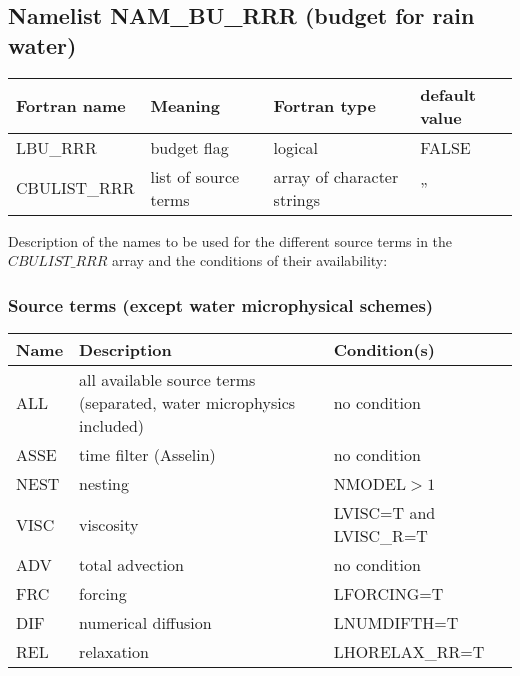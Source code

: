 \subsection{Namelist NAM\_BU\_RRR (budget for rain water)}

\begin{longtable} {|p{}|p{}|>{\centering}p{}|p{}<{\centering}|}
\hline
Fortran name & Meaning & Fortran type & default value \\
\hline \hline
\endhead
LBU\_RRR & budget flag & logical & FALSE\index{LBU\_RRR!\innam{NAM\_BU\_RRR}} \\\hline
CBULIST\_RRR & list of source terms & array of character strings & ''\index{CBULIST\_RRR!\innam{NAM\_BU\_RRR}} \\\hline
\end{longtable}

Description of the names to be used for the different source terms in the $CBULIST\_RRR$ array and the conditions of their availability:

\subsubsection{Source terms (except water microphysical schemes)}

\begin{longtable} {|p{}|p{}|p{}|}
\hline
Name & Description & Condition(s) \\
\hline \hline
\endhead
ALL    & all available source terms (separated,  water microphysics included) & no condition \\\hline \hline
ASSE   & time filter (Asselin) & no condition           \\\hline
NEST   & nesting               & NMODEL$>1$             \\\hline
VISC   & viscosity             & LVISC=T and LVISC\_R=T \\\hline
ADV    & total advection       & no condition           \\\hline
FRC    & forcing               & LFORCING=T             \\\hline
DIF    & numerical diffusion   & LNUMDIFTH=T            \\\hline
REL    & relaxation            & LHORELAX\_RR=T         \\\hline
\end{longtable}

